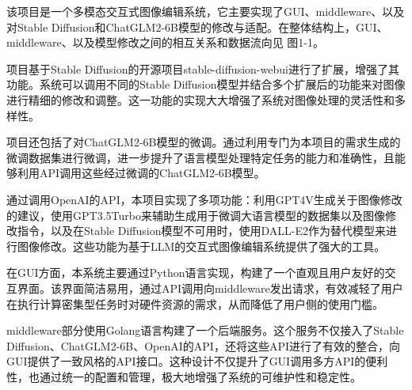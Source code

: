 \documentclass[a4paper,AutoFakeBold,oneside,12pt]{book}
\begin{document}






该项目是一个多模态交互式图像编辑系统，它主要实现了GUI、middleware、以及对Stable Diffusion和ChatGLM2-6B模型的修改与适配。在整体结构上，GUI、middleware、以及模型修改之间的相互关系和数据流向见 图1-1。

项目基于Stable Diffusion的开源项目stable-diffusion-webui进行了扩展，增强了其功能。系统可以调用不同的Stable Diffusion模型并结合多个扩展后的功能来对图像进行精细的修改和调整。这一功能的实现大大增强了系统对图像处理的灵活性和多样性。

项目还包括了对ChatGLM2-6B模型的微调。通过利用专门为本项目的需求生成的微调数据集进行微调，进一步提升了语言模型处理特定任务的能力和准确性，且能够利用API调用这些经过微调的ChatGLM2-6B模型。

通过调用OpenAI的API，本项目实现了多项功能：利用GPT4V生成关于图像修改的建议，使用GPT3.5Turbo来辅助生成用于微调大语言模型的数据集以及图像修改指令，以及在Stable Diffusion模型不可用时，使用DALL-E2作为替代模型来进行图像修改。这些功能为基于LLM的交互式图像编辑系统提供了强大的工具。

在GUI方面，本系统主要通过Python语言实现，构建了一个直观且用户友好的交互界面。该界面简洁易用，通过API调用向middleware发出请求，有效减轻了用户在执行计算密集型任务时对硬件资源的需求，从而降低了用户侧的使用门槛。

middleware部分使用Golang语言构建了一个后端服务。这个服务不仅接入了Stable Diffusion、ChatGLM2-6B、OpenAI的API，还将这些API进行了有效的整合，向GUI提供了一致风格的API接口。这种设计不仅提升了GUI调用多方API的便利性，也通过统一的配置和管理，极大地增强了系统的可维护性和稳定性。
\end{document}
